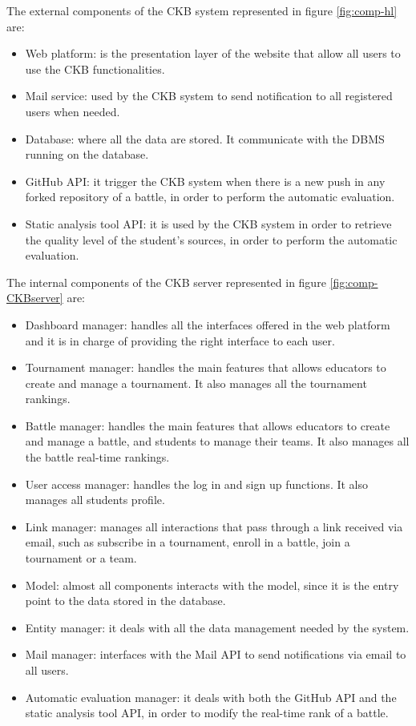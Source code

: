 The external components of the CKB system represented in figure \ref{fig:comp-hl} are:
\begin{itemize}
    \item Web platform: is the presentation layer of the website that allow all users to use the CKB functionalities.
    \item Mail service: used by the CKB system to send notification to all registered users when needed.
    \item Database: where all the data are stored. It communicate with the DBMS running on the database.
    \item GitHub API: it trigger the CKB system when there is a new push in any forked repository of a battle, in order to perform the automatic evaluation. 
    \item Static analysis tool API: it is used by the CKB system in order to retrieve the quality level of the student's sources, in order to perform the automatic evaluation. 
\end{itemize}

The internal components of the CKB server represented in figure \ref{fig:comp-CKBserver} are:
\begin{itemize}
    \item Dashboard manager: handles all the interfaces offered in the web platform and it is in charge of providing the right interface to each user.
    \item Tournament manager: handles the main features that allows educators to create and manage a tournament. It also manages all the tournament rankings.
    \item Battle manager: handles the main features that allows educators to create and manage a battle, and students to manage their teams. It also manages all the battle real-time rankings.
    \item User access manager: handles the log in and sign up functions. It also manages all students profile.
    \item Link manager: manages all interactions that pass through a link received via email, such as subscribe in a tournament, enroll in a battle, join a tournament or a team.
    \item Model: almost all components interacts with the model, since it is the entry point to the data stored in the database.
    \item Entity manager: it deals with all the data management needed by the system.
    \item Mail manager: interfaces with the Mail API to send notifications via email to all users.
    \item Automatic evaluation manager: it deals with both the GitHub API and the static analysis tool API, in order to modify the real-time rank of a battle.
\end{itemize}

